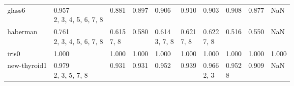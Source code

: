 \begin{tabular}{llllllllll}
glass6                 &     \makecell{0.957 \\ \scriptsize{2, 3, 4, 5, 6, 7, 8}} &      \makecell{0.881 \\ \scriptsize{}} &            \makecell{0.897 \\ \scriptsize{}} &            \makecell{0.906 \\ \scriptsize{}} &         \makecell{0.910 \\ \scriptsize{}} &            \makecell{0.903 \\ \scriptsize{}} &   \makecell{0.908 \\ \scriptsize{}} &   \makecell{0.877 \\ \scriptsize{}} &                                    NaN \\
haberman               &     \makecell{0.761 \\ \scriptsize{2, 3, 4, 5, 6, 7, 8}} &  \makecell{0.615 \\ \scriptsize{7, 8}} &            \makecell{0.580 \\ \scriptsize{}} &     \makecell{0.614 \\ \scriptsize{3, 7, 8}} &     \makecell{0.621 \\ \scriptsize{7, 8}} &        \makecell{0.622 \\ \scriptsize{7, 8}} &   \makecell{0.516 \\ \scriptsize{}} &   \makecell{0.550 \\ \scriptsize{}} &                                    NaN \\
iris0                  &                        \makecell{1.000 \\ \scriptsize{}} &      \makecell{1.000 \\ \scriptsize{}} &            \makecell{1.000 \\ \scriptsize{}} &            \makecell{1.000 \\ \scriptsize{}} &         \makecell{1.000 \\ \scriptsize{}} &            \makecell{1.000 \\ \scriptsize{}} &   \makecell{1.000 \\ \scriptsize{}} &   \makecell{1.000 \\ \scriptsize{}} &      \makecell{1.000 \\ \scriptsize{}} \\
new-thyroid1           &           \makecell{0.979 \\ \scriptsize{2, 3, 5, 7, 8}} &      \makecell{0.931 \\ \scriptsize{}} &            \makecell{0.931 \\ \scriptsize{}} &            \makecell{0.952 \\ \scriptsize{}} &         \makecell{0.939 \\ \scriptsize{}} &        \makecell{0.966 \\ \scriptsize{2, 3}} &  \makecell{0.952 \\ \scriptsize{8}} &   \makecell{0.909 \\ \scriptsize{}} &                                    NaN \\

\end{tabular}

